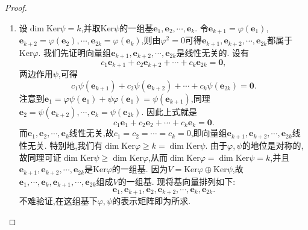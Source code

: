 \documentclass[../../main.tex]{subfiles}%
\begin{document}
\begin{proof}
\begin{enumerate}[(1)]
\item 设\(\dim\text{Ker}\psi=k\),并取\(\text{Ker}\psi\)的一组基\(\boldsymbol{e}_1,\boldsymbol{e}_2,\cdots,\boldsymbol{e}_k\). 令\(\boldsymbol{e}_{k + 1}=\varphi(\boldsymbol{e}_1)\),\(\boldsymbol{e}_{k + 2}=\varphi(\boldsymbol{e}_2),\cdots,\boldsymbol{e}_{2k}=\varphi(\boldsymbol{e}_k)\),则由\(\varphi^2 = 0\)可得\(\boldsymbol{e}_{k + 1},\boldsymbol{e}_{k + 2},\cdots,\boldsymbol{e}_{2k}\)都属于\(\text{Ker}\varphi\). 我们先证明向量组\(\boldsymbol{e}_{k + 1},\boldsymbol{e}_{k + 2},\cdots,\boldsymbol{e}_{2k}\)是线性无关的. 设有
\[
c_1\boldsymbol{e}_{k + 1}+c_2\boldsymbol{e}_{k + 2}+\cdots + c_k\boldsymbol{e}_{2k}=\boldsymbol{0},
\]
两边作用\(\psi\),可得
\[
c_1\psi(\boldsymbol{e}_{k + 1})+c_2\psi(\boldsymbol{e}_{k + 2})+\cdots + c_k\psi(\boldsymbol{e}_{2k})=\boldsymbol{0}.
\]
注意到\(\boldsymbol{e}_1=\varphi\psi(\boldsymbol{e}_1)+\psi\varphi(\boldsymbol{e}_1)=\psi(\boldsymbol{e}_{k + 1})\),同理\(\boldsymbol{e}_2=\psi(\boldsymbol{e}_{k + 2}),\cdots,\boldsymbol{e}_k=\psi(\boldsymbol{e}_{2k})\). 因此上式就是
\[
c_1\boldsymbol{e}_1+c_2\boldsymbol{e}_2+\cdots + c_k\boldsymbol{e}_k=\boldsymbol{0}.
\]
而\(\boldsymbol{e}_1,\boldsymbol{e}_2,\cdots,\boldsymbol{e}_k\)线性无关,故\(c_1 = c_2=\cdots = c_k = 0\),即向量组\(\boldsymbol{e}_{k + 1},\boldsymbol{e}_{k + 2},\cdots,\boldsymbol{e}_{2k}\)线性无关. 特别地,我们有\(\dim\text{Ker}\varphi\geqslant  k=\dim\text{Ker}\psi\). 由于\(\varphi,\psi\)的地位是对称的,故同理可证\(\dim\text{Ker}\psi\geqslant \dim\text{Ker}\varphi\),从而\(\dim\text{Ker}\varphi=\dim\text{Ker}\psi = k\),并且\(\boldsymbol{e}_{k + 1},\boldsymbol{e}_{k + 2},\cdots,\boldsymbol{e}_{2k}\)是\(\text{Ker}\varphi\)的一组基. 因为\(V=\text{Ker}\varphi\oplus\text{Ker}\psi\),故\(\boldsymbol{e}_1,\cdots,\boldsymbol{e}_k,\boldsymbol{e}_{k + 1},\cdots,\boldsymbol{e}_{2k}\)组成\(V\)的一组基. 现将基向量排列如下:
\[
\boldsymbol{e}_1,\boldsymbol{e}_{k + 1},\boldsymbol{e}_2,\boldsymbol{e}_{k + 2},\cdots,\boldsymbol{e}_k,\boldsymbol{e}_{2k}.
\]
不难验证,在这组基下\(\varphi,\psi\)的表示矩阵即为所求.
\end{enumerate}

\end{proof}
\end{document}
